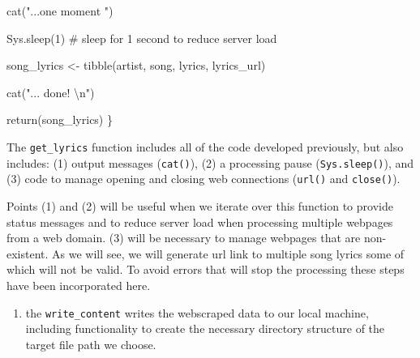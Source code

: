 \documentclass[
  letterpaper,
]{latex/krantz}
\newenvironment{Shaded}{\begin{snugshade}}{\end{snugshade}}
\newcommand{\CommentTok}[1]{\textcolor[rgb]{0.37,0.37,0.37}{#1}}
\newcommand{\DecValTok}[1]{\textcolor[rgb]{0.68,0.00,0.00}{#1}}
\newcommand{\FunctionTok}[1]{\textcolor[rgb]{0.28,0.35,0.67}{#1}}
\newcommand{\NormalTok}[1]{\textcolor[rgb]{0.00,0.23,0.31}{#1}}
\newcommand{\OtherTok}[1]{\textcolor[rgb]{0.00,0.23,0.31}{#1}}
\newcommand{\SpecialCharTok}[1]{\textcolor[rgb]{0.37,0.37,0.37}{#1}}
\newcommand{\StringTok}[1]{\textcolor[rgb]{0.13,0.47,0.30}{#1}}
\providecommand{\tightlist}{%
  \setlength{\itemsep}{0pt}\setlength{\parskip}{0pt}}\usepackage{longtable,booktabs,array}
\begin{document}
\begin{Shaded}
\begin{Highlighting}[]
  \FunctionTok{cat}\NormalTok{(}\StringTok{"...one moment "}\NormalTok{)}
  
  \FunctionTok{Sys.sleep}\NormalTok{(}\DecValTok{1}\NormalTok{) }\CommentTok{\# sleep for 1 second to reduce server load}
  
\NormalTok{  song\_lyrics }\OtherTok{\textless{}{-}} \FunctionTok{tibble}\NormalTok{(artist, song, lyrics, lyrics\_url)}
  
  \FunctionTok{cat}\NormalTok{(}\StringTok{"... done! }\SpecialCharTok{\textbackslash{}n}\StringTok{"}\NormalTok{)}
  
  \FunctionTok{return}\NormalTok{(song\_lyrics)}
\NormalTok{\}}
\end{Highlighting}
\end{Shaded}

\begin{tcolorbox}[enhanced jigsaw, opacitybacktitle=0.6, breakable, colframe=quarto-callout-warning-color-frame, arc=.35mm, left=2mm, leftrule=.75mm, title=\textcolor{quarto-callout-warning-color}{\faExclamationTriangle}\hspace{0.5em}{Tip}, opacityback=0, colback=white, toptitle=1mm, rightrule=.15mm, titlerule=0mm, bottomtitle=1mm, bottomrule=.15mm, coltitle=black, colbacktitle=quarto-callout-warning-color!10!white, toprule=.15mm]
The \texttt{get\_lyrics} function includes all of the code developed
previously, but also includes: (1) output messages (\texttt{cat()}), (2)
a processing pause (\texttt{Sys.sleep()}), and (3) code to manage
opening and closing web connections (\texttt{url()} and
\texttt{close()}).

Points (1) and (2) will be useful when we iterate over this function to
provide status messages and to reduce server load when processing
multiple webpages from a web domain. (3) will be necessary to manage
webpages that are non-existent. As we will see, we will generate url
link to multiple song lyrics some of which will not be valid. To avoid
errors that will stop the processing these steps have been incorporated
here.
\end{tcolorbox}

\begin{enumerate}
\def\labelenumi{\arabic{enumi}.}
\setcounter{enumi}{1}
\tightlist
\item
  the \texttt{write\_content} writes the webscraped data to our local
  machine, including functionality to create the necessary directory
  structure of the target file path we choose.
\end{enumerate}
\end{document}
